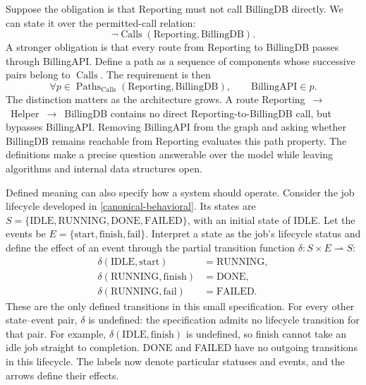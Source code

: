 Suppose the obligation is that Reporting must not call BillingDB directly. We can state it over the permitted-call relation:
\[
\neg\operatorname{Calls}(\mathrm{Reporting},\mathrm{BillingDB}).
\]
A stronger obligation is that every route from Reporting to BillingDB passes through BillingAPI. Define a path as a sequence of components whose successive pairs belong to \(\operatorname{Calls}\). The requirement is then
\[
\forall p\in\operatorname{Paths}_{\operatorname{Calls}}(\mathrm{Reporting},\mathrm{BillingDB}),
\qquad \mathrm{BillingAPI}\in p.
\]
The distinction matters as the architecture grows. A route Reporting~\(\to\)~Helper~\(\to\)~BillingDB contains no direct Reporting-to-BillingDB call, but bypasses BillingAPI. Removing BillingAPI from the graph and asking whether BillingDB remains reachable from Reporting evaluates this path property. The definitions make a precise question answerable over the model while leaving algorithms and internal data structures open.


Defined meaning can also specify how a system should operate. Consider the job lifecycle developed in \autoref{canonical-behavioral}. Its states are \(S=\{\mathrm{IDLE},\mathrm{RUNNING},\mathrm{DONE},\mathrm{FAILED}\}\), with an initial state of IDLE. Let the events be \(E=\{\mathrm{start},\mathrm{finish},\mathrm{fail}\}\). Interpret a state as the job's lifecycle status and define the effect of an event through the partial transition function \(\delta:S\times E\rightharpoonup S\):
\[
\begin{aligned}
\delta(\mathrm{IDLE},\mathrm{start}) &= \mathrm{RUNNING},\\
\delta(\mathrm{RUNNING},\mathrm{finish}) &= \mathrm{DONE},\\
\delta(\mathrm{RUNNING},\mathrm{fail}) &= \mathrm{FAILED}.
\end{aligned}
\]
These are the only defined transitions in this small specification. For every other state--event pair, \(\delta\) is undefined: the specification admits no lifecycle transition for that pair. For example, \(\delta(\mathrm{IDLE},\mathrm{finish})\) is undefined, so finish cannot take an idle job straight to completion. DONE and FAILED have no outgoing transitions in this lifecycle. The labels now denote particular statuses and events, and the arrows define their effects.

